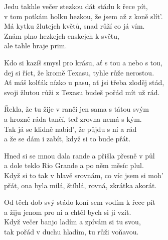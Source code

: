 
\ve{}
Jedu takhle večer stezkou dát stádu k řece pít,\\
v tom potkám holku hezkou, že jsem až z koně slít'.\\
Má kytku žlutejch květů, snad růží co já vím.\\
Znám plno hezkejch enskejch k světu,\\
ale tahle hraje prim.

\cho{}
Kdo si kazíš smysl pro krásu, ať s tou a nebo s tou,\\
dej si říct, že kromě Texasu, tyhle růže nerostou.\\
Ať máš kolťák nízko u pasu, ať jsi třeba zloděj stád,\\
svoji žlutou růži z Texasu budeš pořád mít už rád.

\ve{}
Řekla, že tu žije v ranči jen sama s tátou svým\\
a hrozně ráda tančí, teď zrovna nemá s kým.\\
Tak já se klidně nabíd', že půjdu s ní a rád\\
a že se dám i zabít, když si to bude přát.

\cho{}

\ve{}
Hned si se mnou dala rande a přišla přesně v půl\\
a dole teklo Rio Grande a po něm měsíc plul.\\
Když si to tak v hlavě srovnám, co víc jsem si moh'\\
přát, ona byla milá, štíhlá, rovná, zkrátka akorát.

\cho{}

\ve{}
Od těch dob svý stádo koní sem vodím k řece pít\\
a žiju jenom pro ni a chtěl bych si ji vzít.\\
Když večer banjo ladím a zpívám si tu svou,\\
tak pořád v duchu hladím, tu růži voňavou.

\cho{}

\esong